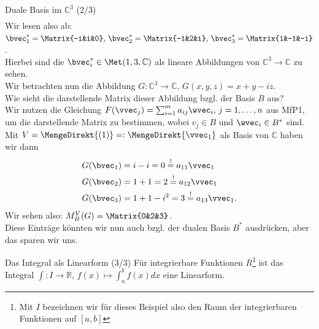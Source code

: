 \begin{Beispiel}{Duale Basis im $\mathbb{C}^3$ (2/3)}
{\begin{align*}
\end{align*}
Wir lesen also ab: $\bvec_1^*=\Matrix{-i&i&0},\,\bvec_2^*=\Matrix{-1&2&i},\,\bvec_3^*=\Matrix{1&-1&-i}$.\\
Hierbei sind die $\bvec_i^*\in\Met(1,3,\mathbb{C})$ als lineare Abbildungen von $\mathbb{C}^3\to\mathbb{C}$ zu sehen.}\\
Wir betrachten nun die Abbildung $G:\mathbb{C}^3\to\mathbb{C},\, G(x,y,z)=x+y-iz$.\\
Wie sieht die darstellende Matrix dieser Abbildung bzgl. der Basis $B$ aus?\\
Wir nutzen die Gleichung $F(\vvec_j)=\sum_{i=1}^ma_{ij}\wvec_i,\,j=1,\ldots,n$ aus MfP1, um die darstellende Matrix zu bestimmen, wobei $v_j\in B$ und $\wvec_i\in B^*$ sind. Mit $V=\MengeDirekt{(1)}=:\MengeDirekt{\vvec_1}$ als Basis von $\mathbb{C}$ haben wir dann
\begin{align*}
    G(\bvec_1)&=i-i=0\overset{!}{=}a_{11}\vvec_1\\
    G(\bvec_2)&=1+1=2\overset{!}{=}a_{12}\vvec_1\\
    G(\bvec_3)&=1+1-i^2=3\overset{!}{=}a_{13}\vvec_1.
\end{align*}
Wir sehen also: $M_B^V(G)=\Matrix{0&2&3}$.\\
Diese Einträge könnten wir nun auch bzgl. der dualen Basis $B^*$ ausdrücken, aber das sparen wir uns.
\end{Beispiel}
\begin{Beispiel}
{Das Integral als Linearform (3/3)}
Für integrierbare Funktionen $R$\footnote{Mit $I$ bezeichnen wir für dieses Beispiel also den Raum der integrierbaren Funktionen auf $[a,b]$} ist das Integral $\int: I\to \mathbb{R},\,f(x)\mapsto\int_a^bf(x)dx$ eine Linearform.
\end{Beispiel}


